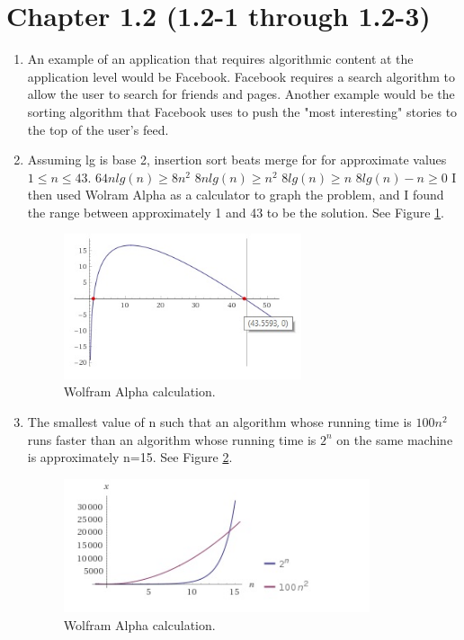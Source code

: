 \documentclass[12pt]{article}
\begin{document}
\section{Chapter 1.2 (1.2-1 through 1.2-3)}

\begin{enumerate}
    
  \item An example of an application that requires algorithmic content at the application level would be Facebook. Facebook requires a search algorithm to allow the user to search for friends and pages. Another example would be the sorting algorithm that Facebook uses to push the "most interesting" stories to the top of the user's feed.
    
  \item Assuming lg is base 2, insertion sort beats merge for for approximate values $1 \leq n \leq 43$. \newline $64nlg(n) \geq 8n^2$ \newline $8nlg(n) \geq n^2$ \newline $8lg(n) \geq n$ \newline $8lg(n)-n \geq 0$ \newline I then used Wolram Alpha as a calculator to graph the problem, and I found the range between approximately 1 and 43 to be the solution. See Figure \ref{figure1}. \newline 

\begin{figure}[h!]
\includegraphics[width=7cm]{Graph.jpg}
\centering
\caption{Wolfram Alpha calculation.}
\label{figure1}
\end{figure}
    
  \item The smallest value of n such that an algorithm whose running time is $100n^2$ runs faster than an algorithm whose running time is $2^n$ on the same machine is approximately n=15. See Figure \ref{figure2}. \newline 

\begin{figure}[h!]
\includegraphics[width=9cm]{Graph2.jpg}
\centering
\caption{Wolfram Alpha calculation.}
\label{figure2}
\end{figure}
    
\end{enumerate}
    
\end{document}
